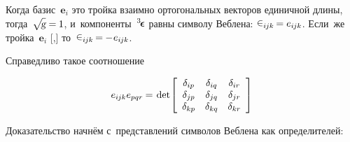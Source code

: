 \begin{otherlanguage}{russian}
Когда базис~${\bm{e}_i}$ это  тройка взаимно ортогональных векторов единичной длины, тогда~${\sqrt{\hspace{-0.36ex}\mathstrut{\textsl{g}}} = \hspace{-0.1ex} 1}$, и~компоненты~${^3\hspace{-0.25ex}\bm{\epsilon}}\hspace{.05ex}$ равны символу Веблена: ${\levicivita_{i\hspace{-0.1ex}jk} \hspace{-0.2ex} = e_{i\hspace{-0.1ex}jk}}$. Если~же тройка~${\bm{e}_i}$ [,] то~${\levicivita_{i\hspace{-0.1ex}jk} \hspace{-0.2ex} = \hspace{-0.1ex} - \hspace{.1ex} e_{i\hspace{-0.1ex}jk}}$.

Справедливо такое соотношение

\nopagebreak\begin{equation}\label{doubleveblen}
e_{i\hspace{-0.1ex}jk} e_{pqr} \hspace{-0.1ex} = \hspace{.2ex}
\operatorname{det} \hspace{-0.25ex} \left[
\begin{array}{ccc}
\delta_{ip} & \delta_{iq} & \delta_{ir} \\
\delta_{jp} & \delta_{jq} & \delta_{jr} \\
\delta_{kp} & \delta_{kq} & \delta_{kr}
\end{array}
\right]
\end{equation}

\noindent Доказательство начнём с~представлений символов Веблена как определителей:


\end{otherlanguage}
